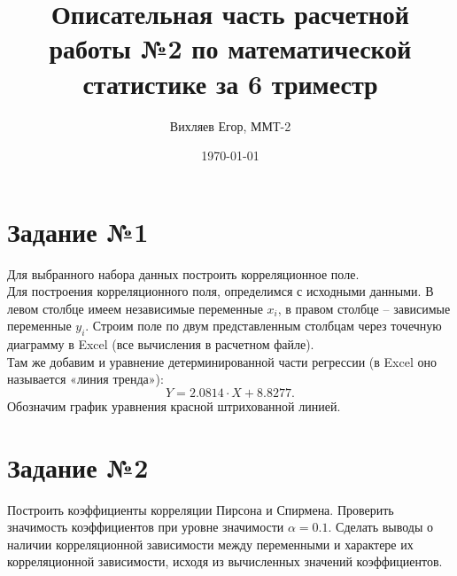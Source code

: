 \documentclass[12pt, letterpaper, twoside]{article}
\title{Описательная часть расчетной работы №2 по математической статистике за 6 триместр}
\author{Вихляев Егор, ММТ-2}
\date\today
\begin{document}
	
	\maketitle
	
	\section{Задание №1}
	Для выбранного набора данных построить корреляционное поле.\\
	
	Для построения корреляционного поля, определимся с исходными данными. В левом столбце имеем независимые переменные $x_i$, в правом столбце -- зависимые переменные $y_i$. Строим поле по двум представленным столбцам через точечную диаграмму в Excel (все вычисления в расчетном файле). 
	\\
	Там же добавим и уравнение детерминированной части регрессии (в Excel оно называется «линия тренда»): $$Y = 2.0814 \cdot X + 8.8277.$$ Обозначим график уравнения красной штрихованной линией.
	
	\section{Задание №2}
	Построить коэффициенты корреляции Пирсона и Спирмена. Проверить значимость
	коэффициентов при уровне значимости $\alpha = 0.1$. Сделать выводы о наличии
	корреляционной зависимости между переменными и характере их
	корреляционной зависимости, исходя из вычисленных значений
	коэффициентов. \\
	
\end{document}
